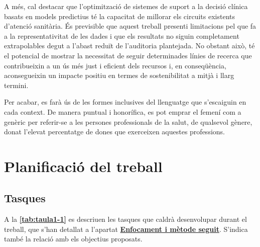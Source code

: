 \documentclass[CAT]{TFUOC}%
\begin{document}
A més, cal destacar que l'optimització de sistemes de suport a la decisió clínica basats en models predictius té la capacitat de millorar els circuits existents d'atenció sanitària. És previsible que aquest treball presenti limitacions pel que fa a la representativitat de les dades i que els resultats no siguin completament extrapolables degut a l'abast reduït de l'auditoria plantejada. No obstant això, té el potencial de mostrar la necessitat de seguir determinades línies de recerca que contribueixin a un ús més just i eficient dels recursos i, en conseqüència, aconsegueixin un impacte positiu en termes de sostenibilitat a mitjà i llarg termini.

Per acabar, es farà ús de les formes inclusives del llenguatge que s'escaiguin en cada context. De manera puntual i honorífica, es pot emprar el femení com a genèric per referir-se a les persones professionals de la salut, de qualsevol gènere, donat l'elevat percentatge de dones que exerceixen aquestes professions.

\pagebreak

\section{Planificació del treball}\label{planificaciuxf3-del-treball}

\subsection{Tasques}\label{tasques}

A la \textbf{\autoref{tab:taula1-1}} es descriuen les tasques que caldrà desenvolupar durant el treball, que s'han detallat a l'apartat \textbf{\hyperref[enfocament-i-muxe8tode-seguit]{Enfocament i mètode seguit}}. S'indica també la relació amb els objectius proposats.
\end{document}
